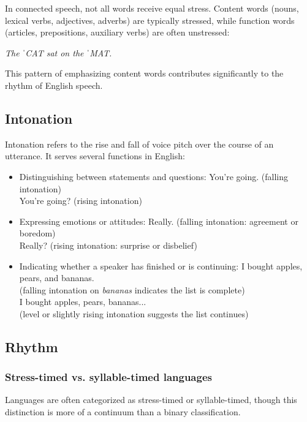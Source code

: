 In connected speech, not all words receive equal stress. Content words (nouns, lexical verbs, adjectives, adverbs) are typically stressed, while function words (articles, prepositions, auxiliary verbs) are often unstressed:

\ea \textit{The ˈCAT sat on the ˈMAT.}
\z

This pattern of emphasizing content words contributes significantly to the rhythm of English speech.

\subsection{Intonation}\label{sec:intonation}

Intonation refers to the rise and fall of voice pitch over the course of an utterance. It serves several functions in English:

\begin{itemize}[noitemsep]
    \item Distinguishing between statements and questions:
        \ea
        You're going. \hfill(falling intonation)\\
        You're going? \hfill(rising intonation)
        \z
    \item Expressing emotions or attitudes:
        \ea
        Really. \hfill(falling intonation: agreement or boredom)\\
        Really? \hfill(rising intonation: surprise or disbelief)
        \z
    \item Indicating whether a speaker has finished or is continuing:
        \ea
        I bought apples, pears, and bananas. \\\hfill(falling intonation on \textit{bananas} indicates the list is complete)\\
        I bought apples, pears, bananas... \\\hfill(level or slightly rising intonation suggests the list continues)
        \z
\end{itemize}

\subsection{Rhythm}

\subsubsection{Stress-timed vs. syllable-timed languages}

Languages are often categorized as stress-timed or syllable-timed, though this distinction is more of a continuum than a binary classification.

